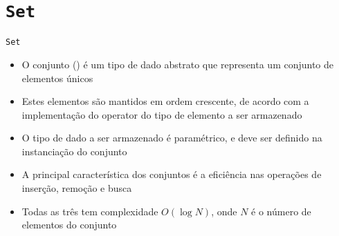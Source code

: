 \section{\texttt{Set}}

\begin{frame}[fragile]{\texttt{Set}}

    \begin{itemize}
        \item O conjunto () é um tipo de dado abstrato que representa um conjunto
            de elementos únicos

        \item Estes elementos são mantidos em ordem crescente, de acordo com a implementação
            do operator  do tipo de elemento a ser armazenado

        \item O tipo de dado a ser armazenado é paramétrico, e deve ser definido na instanciação
            do conjunto

        \item A principal característica dos conjuntos é a eficiência nas operações de inserção,
            remoção e busca

        \item Todas as três tem complexidade $O(\log N)$, onde $N$ é o número de elementos do conjunto
    \end{itemize}

\end{frame}


